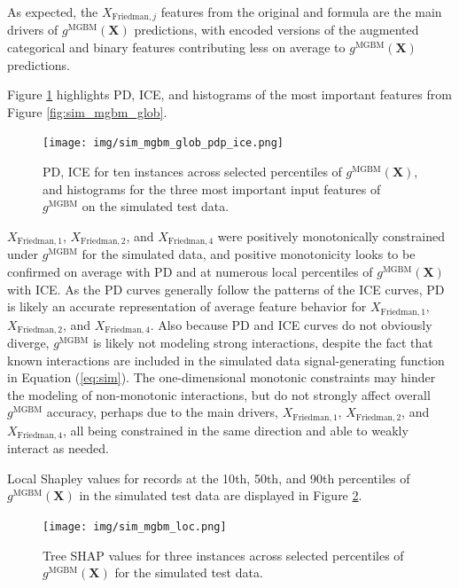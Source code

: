 \documentclass[information,article,accept,moreauthors,pdftex]{Definitions/mdpi}
\begin{document}
As expected, the $X_{\text{Friedman},j}$ features from the original \citet{friedman1979tree} and \citet{friedman1991multivariate} formula are the main drivers of $g^\text{MGBM}(\mathbf{X})$ predictions, with encoded versions of the augmented categorical and binary features contributing less on average to $g^\text{MGBM}(\mathbf{X})$ predictions. 

Figure \ref{fig:sim_mgbm_glob_pdp_ice} highlights PD, ICE, and histograms of the most important features from Figure \ref{fig:sim_mgbm_glob}. 

\begin{figure}[H]
	\centering
	\texttt{[image: img/sim\_mgbm\_glob\_pdp\_ice.png]}
	\caption{PD, ICE for ten instances across selected percentiles of $g^\text{MGBM}(\mathbf{X})$, and histograms for the three most important input features of $g^\text{MGBM}$ on the simulated test data.}
	\label{fig:sim_mgbm_glob_pdp_ice}
\end{figure}   

$X_{\text{Friedman},1}$, $X_{\text{Friedman},2}$, and $X_{\text{Friedman},4}$ were positively monotonically constrained under $g^\text{MGBM}$ for the simulated data, and positive monotonicity looks to be confirmed on average with PD and at numerous local percentiles of $g^\text{MGBM}(\mathbf{X})$ with ICE. As the PD curves generally follow the patterns of the ICE curves, PD is likely an accurate representation of average feature behavior for $X_{\text{Friedman},1}$, $X_{\text{Friedman},2}$, and $X_{\text{Friedman},4}$. Also because PD and ICE curves do not obviously diverge, $g^\text{MGBM}$ is likely not modeling strong interactions, despite the fact that known interactions are included in the simulated data signal-generating function in Equation (\ref{eq:sim}). The one-dimensional monotonic constraints may hinder the modeling of non-monotonic interactions, but do not strongly affect overall $g^\text{MGBM}$ accuracy, perhaps due to the main drivers, $X_{\text{Friedman},1}$, $X_{\text{Friedman},2}$, and $X_{\text{Friedman},4}$, all being constrained in the same direction and able to weakly interact as needed.

Local Shapley values for records at the 10{th}, 50{th}, and 90{th} percentiles of $g^\text{MGBM}(\mathbf{X})$ in the simulated test data are displayed in Figure \ref{fig:sim_mgbm_loc}. 

\begin{figure}[H]
	\centering
	\texttt{[image: img/sim\_mgbm\_loc.png]}
	\caption{Tree SHAP values for three instances across selected percentiles of $g^\text{MGBM}(\mathbf{X})$ for the simulated test data.}
	\label{fig:sim_mgbm_loc}
\end{figure}   
\end{document}
